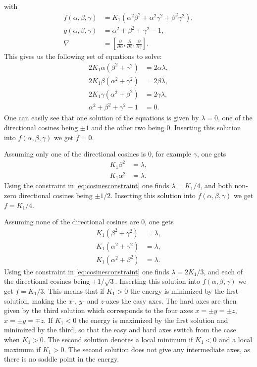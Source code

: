 \documentclass[12pt, a4paper]{article}		%
\numberwithin{equation}{section}
\begin{document}
with
\begin{align}
f(\alpha, \beta, \gamma) &= K_1 (\alpha^2\beta^2+\alpha^2\gamma^2+\beta^2\gamma^2), \\
g(\alpha, \beta, \gamma) &= \alpha^2+\beta^2+\gamma^2 - 1,\\
\nabla &= \left[\frac{\partial}{\partial\alpha}, \frac{\partial}{\partial\beta}, \frac{\partial}{\partial\gamma}\right].
\end{align}
This gives us the following set of equations to solve:
\begin{align*}
2K_1\alpha (\beta^2+\gamma^2) &= 2\alpha\lambda, \\ 
2K_1\beta (\alpha^2+\gamma^2) &= 2\beta\lambda, \\ 
2K_1\gamma (\alpha^2+\beta^2) &= 2\gamma\lambda, \\ 
\alpha^2+\beta^2+\gamma^2 - 1 &= 0.
\end{align*}
One can easily see that one solution of the equations is given by $\lambda = 0$, one of the directional cosines being $\pm 1$ and the other two being 0. Inserting this solution into $f(\alpha, \beta, \gamma)$ we get $f = 0$.

Assuming only one of the directional cosines is 0, for example $\gamma$, one gets
\begin{align*}
K_1 \beta^2 &= \lambda, \\ 
K_1 \alpha^2 &= \lambda.
\end{align*}
Using the constraint in \eqref{eq:cosinesconstraint} one finds $\lambda = K_1/4$, and both non-zero directional cosines being $\pm 1/2$. Inserting this solution into $f(\alpha, \beta, \gamma)$ we get $f = K_1/4$.

Assuming none of the directional cosines are 0, one gets
\begin{align*}
K_1 (\beta^2+\gamma^2) &= \lambda, \\ 
K_1 (\alpha^2+\gamma^2) &= \lambda, \\ 
K_1 (\alpha^2+\beta^2) &= \lambda.
\end{align*}
Using the constraint in \eqref{eq:cosinesconstraint} one finds $\lambda = 2K_1/3$, and each of the directional cosines being $\pm 1/\sqrt{3}$. Inserting this solution into $f(\alpha, \beta, \gamma)$ we get $f = K_1/3$. This means that if $K_1 > 0$ the energy is minimized by the first solution, making the $x$-, $y$- and $z$-axes the easy axes. The hard axes are then given by the third solution which corresponds to the four axes $x = \pm y = \pm z$, $x = \pm y = \mp z$. If $K_1 < 0$ the energy is maximized by the first solution and minimized by the third, so that the easy and hard axes switch from the case when $K_1 > 0$. The second solution denotes a local minimum if $K_1<0$ and a local maximum if $K_1>0$. The second solution does not give any intermediate axes, as there is no saddle point in the energy.
\end{document}
